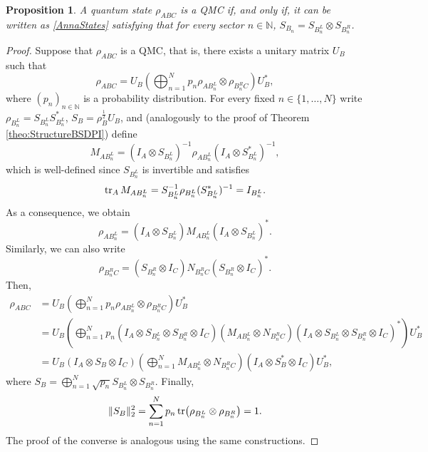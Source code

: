 \documentclass[11pt]{article}
\theoremstyle{newdefinition}
\theoremstyle{newplain}
\newtheorem{proposition}[definition]{Proposition}
\theoremstyle{myplain}
\DeclareMathOperator{\1}{\mathds{1}}
\begin{document}
\begin{proposition}\label{prop:StructureQMC}
    A quantum state  $\rho_{ABC}$ is a QMC if, and only if,  it can be written as \eqref{AnnaStates} satisfying that for every  sector $n \in \mathbb{N}$, $S_{B_n}=S_{B_n^L}\otimes S_{B_n^R}$.
\end{proposition}
\begin{proof}
    Suppose that $\rho_{ABC}$ is a QMC, that is, there exists a unitary matrix $U_B$ such that
    \begin{equation}
        \rho_{ABC}=U_B \left(\bigoplus_{n=1}^N p_n \rho_{AB_{n}^L}\otimes \rho_{B_{n}^RC} \right) U_B^*,
    \end{equation}
    where $(p_n)_{n \in \mathbb{N}}$ is a probability distribution. For every fixed $n \in \{1, \hdots,N\}$ write $ \rho_{B_n^L}=S_{B_n^L}S_{B_n^L}^*$, $S_B=\rho_B^{\frac{1}{2}}U_B$,
    and (analogously to the proof of Theorem \ref{theo:StructureBSDPI}) define 
    \begin{equation}
        M_{AB_n^L}=(I_A \otimes S_{B_n^L})^{-1}\rho_{AB_n^L}(I_A \otimes S_{B_n^L}^*)^{-1},
    \end{equation}
which is well-defined since $S_{B_n^L}$ is invertible and satisfies
\begin{equation}
    \tr_A M_{AB_n^L}=S_{B_n^L}^{-1}\rho_{B_n^L}(S_{B_n^L}^*)^{-1}=I_{B_n^L}.
\end{equation}
As a consequence, we obtain
\begin{equation}
    \rho_{AB_n^L}=(I_A \otimes S_{B_n^L})M_{AB_n^L}(I_A \otimes S_{B_n^L})^*.
\end{equation}
    Similarly, we can also write
\begin{equation}
    \rho_{B_n^RC}=(S_{B_n^R} \otimes I_C) N_{B_n^RC}(S_{B_n^R} \otimes I_C)^*.
\end{equation}
Then,
\begin{subequations}
\begin{align}
        \rho_{ABC}&=U_B\left(\bigoplus_{n=1}^N p_n \rho_{A B_{n}^L}\otimes \rho_{B_{n}^R C}\right)U_B^*\\
        &=U_B \left(\bigoplus_{n=1}^N p_n (I_A \otimes S_{B_n^L}\otimes S_{B_n^R} \otimes I_C)(M_{AB_n^L} \otimes N_{B_n^R C})(I_A \otimes S_{B_n^L}\otimes S_{B_n^R} \otimes I_C)^* \right)U_B^*\\
        &=U_B(I_A \otimes S_B \otimes I_C)\left(\bigoplus_{n=1}^N M_{AB_n^L} \otimes N_{B_n^R C} \right)(I_A\otimes S_B^*\otimes I_C)U_B^*,
\end{align}
\end{subequations}
where $S_B=\displaystyle \bigoplus_{n=1}^N \sqrt{p_n} S_{B_n^L}\otimes S_{B_n^R}$. Finally,
\begin{equation}
    \Vert S_B \Vert_2^2=\sum_{n=1}^N p_n \tr(\rho_{B_n^L}\otimes \rho_{B_n^R})=1.
\end{equation}
The proof of the  converse is analogous using the same constructions.

\end{proof}
\end{document}
